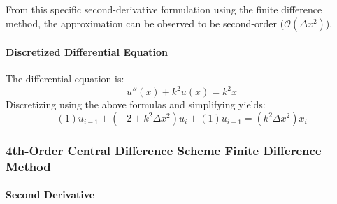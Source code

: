 \documentclass[10pt]{article}		%
\numberwithin{equation}{section}
\begin{document}
From this specific second-derivative formulation using the finite difference method, the approximation can be observed to be second-order ($\mathcal{O}(\Delta x^2)$).

\paragraph{Discretized Differential Equation}

The differential equation is:
\begin{equation}
u''(x)+k^2u(x)=k^2x
\end{equation}
Discretizing using the above formulas and simplifying yields:
\begin{equation}
\left(1\right) u_{i-1} + \left(-2 + k^2\Delta x^2\right) u_{i} + \left(1\right) u_{i+1} = \left(k^2\Delta x^2 \right)x_i
\end{equation}

\subsubsection{4th-Order Central Difference Scheme Finite Difference Method}

\paragraph{Second Derivative}
\end{document}
